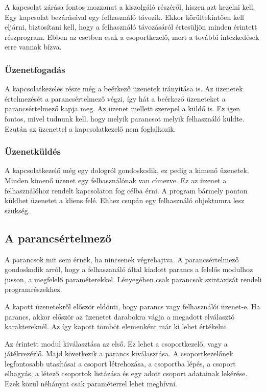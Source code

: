 \documentclass[]{article}
\begin{document}
A kapcsolat zárása fontos mozzanat a kiszolgáló részéről, hiszen azt
kezelni kell. Egy kapcsolat bezárásával egy felhasználó távozik. Ekkor
körültekintően kell eljárni, biztosítani kell, hogy a felhasználó
távozásáról értesüljön minden érintett részprogram. Ebben az esetben
csak a csoportkezelő, mert a további intézkedések erre vannak bízva.

\hypertarget{uxfczenetfogaduxe1s}{%
\subsubsection{Üzenetfogadás}\label{uxfczenetfogaduxe1s}}

A kapcsolatkezelés része még a beérkező üzenetek irányítása is. Az
üzenetek értelmezését a parancsértelmező végzi, így hát a beérkező
üzeneteket a parancsértelmező kapja meg. Az üzenet mellett szerepel a
küldő is. Ez igen fontos, mivel tudnunk kell, hogy melyik parancsot
melyik felhasználó küldte. Ezután az üzenettel a kapcsolatkezelő nem
foglalkozik.

\hypertarget{uxfczenetkuxfclduxe9s}{%
\subsubsection{Üzenetküldés}\label{uxfczenetkuxfclduxe9s}}

A kapcsolatkezelő még egy dologról gondoskodik, ez pedig a kimenő
üzenetek. Minden kimenő üzenet egy felhasználónak van címezve. Ez az
üzenet a felhasználóhoz rendelt kapcsolaton fog célba érni. A program
bármely ponton küldhet üzenetet a kliens felé. Ehhez csupán egy
felhasználó objektumra lesz szükség.

\hypertarget{a-parancsuxe9rtelmezux151}{%
\subsection{A parancsértelmező}\label{a-parancsuxe9rtelmezux151}}

A parancsok mit sem érnek, ha nincsenek végrehajtva. A parancsértelmező
gondoskodik arról, hogy a felhaszanáló által kiadott parancs a felelős
modulhoz jusson, a megfelelő paraméterekkel. Lényegében csak parancsok
szintaxisát rendeli programrészekhez.

A kapott üzenetekről először eldönti, hogy parancs vagy felhasználói
üzenet-e. Ha parancs, akkor először az üzenetet darabokra vágja a
megadott elválasztó karaktereknél. Az így kapott tömböt elemenként már
ki lehet értékelni.

Az érintett modul kiválasztása az első. Ez lehet a csoportkezelő, vagy a
játékvezérlő. Majd következik a parancs kiválasztása. A csoportkezelőnek
legfontosabb utasításai a csoport létrehozása, a csoportba lépés, a
csoport elhagyás, a létező csoportok listázása és egy adott csoport
adatainak lekérése. Ezek közül néhányat csak paraméterrel lehet
meghívni.
\end{document}
